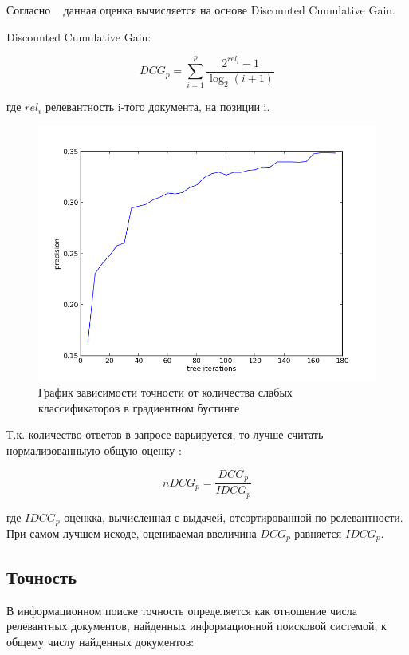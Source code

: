Согласно ~\cite{ndcg_book} данная оценка вычисляется на основе Discounted Cumulative Gain. 

Discounted Cumulative Gain:

\begin{equation}
	DCG_p=\sum_{i=1}^{p}\frac{2^{{rel}_i}-1}{\log_2(i+1)}
\end{equation}
\par
где ${rel}_i$ релевантность i-того документа, на позиции i. 

\begin{figure}[h]
  \centering
  \includegraphics[width=1.0\textwidth]{images/precision_trees.png}
  \caption{График зависимости точности от количества слабых классификаторов в градиентном бустинге\label{precision-picture}}
\end{figure}

Т.к. количество ответов в запросе варьируется, то лучше считать нормализованныую общую оценку :

\begin{equation}
	{nDCG}_p=\frac{{DCG}_p}{{IDCG}_p}
\end{equation}
\par
где ${{IDCG}_p}$ оценкка, вычисленная с выдачей, отсортированной по релевантности. При самом лучшем исходе, оцениваемая ввеличина ${{DCG}_p}$ равняется ${{IDCG}_p}$. 

\subsection{Точность}

В информационном поиске точность определяется как отношение числа релевантных документов, найденных информационной поисковой системой, к общему числу найденных документов:

